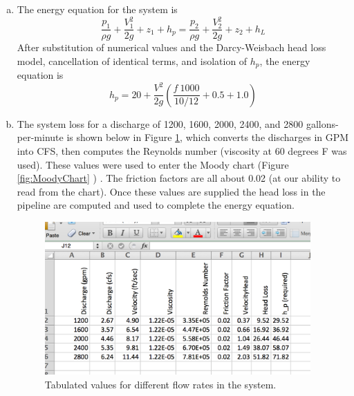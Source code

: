 \documentclass[12pt]{article}
\begin{document}
\begin{enumerate}[a)]
\item The energy equation for the system is
\begin{equation}
\frac{p_1}{\rho g} + \frac{V_1^2}{2g} + z_1 + h_p = \frac{p_2}{\rho g} + \frac{V_2^2}{2g} + z_2 + h_L
\end{equation}
After substitution of numerical values and the Darcy-Weisbach head loss model, cancellation of identical terms, and isolation of $h_p$, the energy equation is 
\begin{equation}
h_p = 20 + \frac{V^2}{2g}(\frac{f~1000}{10/12} + 0.5 + 1.0)
\end{equation}
\item The system loss for a discharge of 1200, 1600, 2000, 2400, and 2800 gallons-per-minute is shown below in Figure \ref{fig:SystemTable}, which converts the discharges in GPM into CFS, then computes the Reynolds number (viscosity at 60 degrees F was used).  These values were used to enter the Moody chart (Figure \ref{fig:MoodyChart} ) .  The friction factors are all about 0.02 (at our ability to read from the chart).  Once these values are supplied the head loss in the pipeline are computed and used to complete the energy equation.

\begin{figure}[h!] %
\centering
   \includegraphics[width=4in]{SystemTable.jpg}
   \caption{Tabulated values for different flow rates in the system.}
   \label{fig:SystemTable} 
\end{figure}


\end{enumerate}
\end{document}
